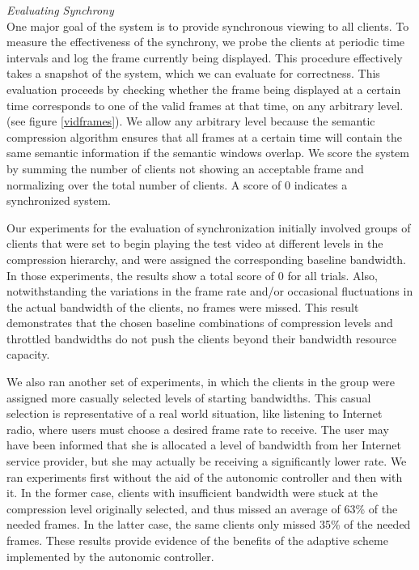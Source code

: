 \documentclass{sig-alternate}
\begin{document}

\textit{Evaluating Synchrony} \\ One major goal of the system is to
provide synchronous viewing to all clients.  To measure the
effectiveness of the synchrony, we probe the clients at periodic time
intervals and log the frame currently being displayed.  This procedure
effectively takes a snapshot of the system, which we can evaluate for
correctness.  This evaluation proceeds by checking whether the frame
being displayed at a certain time corresponds to one of the valid
frames at that time, on any arbitrary level.  (see figure
\ref{vidframes}).  We allow any arbitrary level because the semantic
compression algorithm ensures that all frames at a certain time will
contain the same semantic information if the semantic windows overlap.
We score the system by summing the number of clients not showing an
acceptable frame and normalizing over the total number of clients.  A
score of 0 indicates a synchronized system.

Our experiments for the evaluation of synchronization initially
involved groups of clients that were set to begin playing the test
video at different levels in the compression hierarchy, and were
assigned the corresponding baseline bandwidth. In those experiments,
the results show a total score of 0 for all trials. Also,
notwithstanding the variations in the frame rate and/or occasional
fluctuations in the actual bandwidth of the clients, no frames were
missed.  This result demonstrates that the chosen baseline
combinations of compression levels and throttled bandwidths do not
push the clients beyond their bandwidth resource capacity.

We also ran another set of experiments, in which the clients in the
group were assigned more casually selected levels of starting
bandwidths.  This casual selection is representative of a real world
situation, like listening to Internet radio, where users must choose a
desired frame rate to receive.  The user may have been informed that
she is allocated a level of bandwidth from her Internet service
provider, but she may actually be receiving a significantly lower
rate.  We ran experiments first without the aid of the autonomic
controller and then with it. In the former case, clients with
insufficient bandwidth were stuck at the compression level originally
selected, and thus missed an average of 63\% of the needed frames.  In
the latter case, the same clients only missed 35\% of the needed
frames.  These results provide evidence of the benefits of the
adaptive scheme implemented by the autonomic controller.
\end{document}

